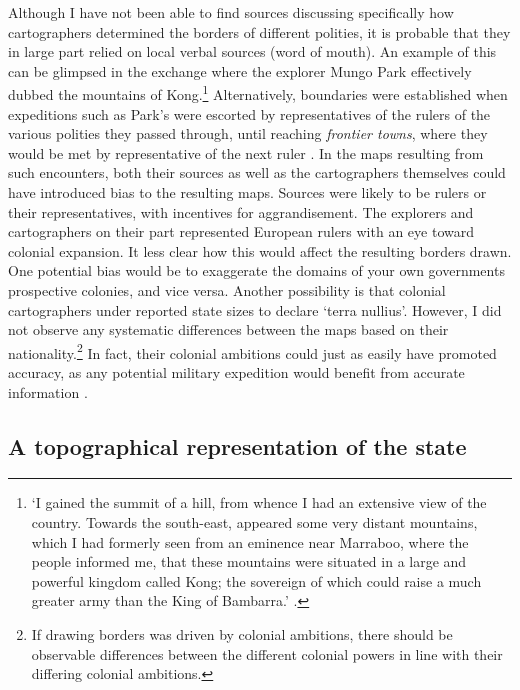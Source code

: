 \documentclass[12pt]{article}
\begin{document}
Although I have not been able to find sources discussing specifically how
cartographers determined the borders of different polities, it is probable that
they in large part relied on local verbal sources (word of mouth). An example of
this can be glimpsed in the exchange where the explorer Mungo Park effectively
dubbed the mountains of Kong.\footnote{`I gained the summit of a hill, from
	whence I had an extensive view of the country. Towards the south-east,
	appeared some very distant mountains, which I had formerly seen from an
	eminence near Marraboo, where the people informed me, that these
	mountains were situated in a large and powerful kingdom called Kong; the
	sovereign of which could raise a much greater army than the King of
Bambarra.' \citep[CHAPTER XVIII]{ParkMungo2015Titi}.} Alternatively, boundaries
were established when expeditions such as Park's were escorted by
representatives of the rulers of the various polities they passed through, until
reaching \textit{frontier towns}, where they would be met by representative of
the next ruler \citep{ParkMungo2015Titi}. In the maps resulting from such
encounters, both their sources as well as the cartographers themselves could
have introduced bias to the resulting maps. Sources were likely to be rulers or
their representatives, with incentives for aggrandisement. The explorers and
cartographers on their part represented European rulers with an eye toward
colonial expansion. It less clear how this would affect the resulting borders
drawn. One potential bias would be to exaggerate the domains of your own
governments prospective colonies, and vice versa. Another possibility is that
colonial cartographers under reported state sizes to declare `terra nullius'.
However, I did not observe any systematic differences between the maps based on
their nationality.\footnote{If drawing borders was driven by colonial ambitions,
there should be observable differences between the different colonial powers in
line with their differing colonial ambitions.} In fact, their colonial ambitions
could just as easily have promoted accuracy, as any potential military
expedition would benefit from accurate information \citep{Bassett_1994}.

\subsection{A topographical representation of the state} 
\label{A topographical representation of the state}
\end{document}
